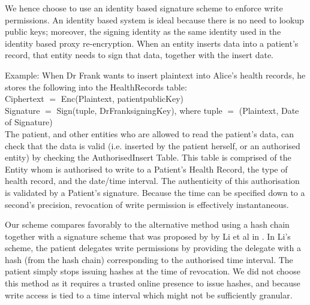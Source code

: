 \documentclass[]{article}
\begin{document}
\begin{itemize}
We hence choose to use an identity based signature scheme \cite{waters2005efficient} to enforce write permissions. An identity based system is ideal because there is no need to lookup public keys; moreover, the signing identity as the same identity used in the identity based proxy re-encryption. When an entity inserts data into a patient's record, that entity needs to sign that data, together with the insert date.

Example:
When Dr Frank wants to insert plaintext into Alice's health records, he stores the following into the HealthRecords table:\\
Ciphertext $=$ Enc(Plaintext, patientpublicKey)\\
Signature $=$ Sign(tuple, DrFranksigningKey), where tuple $=$ (Plaintext, Date of Signature)\\

The patient, and other entities who are allowed to read the patient's data, can check that the data is valid (i.e. inserted by the patient herself, or an authorised entity) by checking the AuthorisedInsert Table. This table is comprised of the Entity whom is authorised to write to a Patient's Health Record, the type of health record, and the date/time interval. The authenticity of this authorisation is validated by a Patient's signature. Because the time can be specified down to a second's precision, revocation of write permission is effectively instantaneous.

Our scheme compares favorably to the alternative method using a hash chain together with a signature scheme that was proposed by by Li et al in \cite{li2013scalable}. In Li's scheme, the patient delegates write permissions by providing the delegate with a hash (from the hash chain) corresponding to the authorised time interval. The patient simply stops issuing hashes at the time of revocation. We did not choose this method as it requires a trusted online presence to issue hashes, and because write access is tied to a time interval which might not be sufficiently granular.


\end{itemize}
\end{document}
